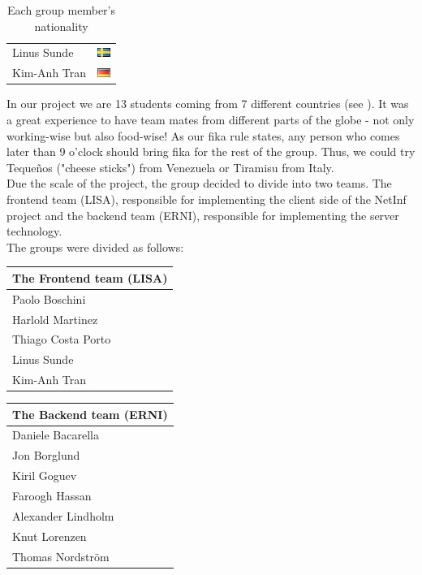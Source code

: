 \begin{table}
\begin{tabular}{|l|c|}
Linus Sunde & \includegraphics{graphics/se.png} \\
Kim-Anh Tran & \includegraphics{graphics/de.png} \\
\hline
\end{tabular}
\caption{Each group member's nationality}\label{fig:nationality}
\end{table}

In our project we are 13 students coming from 7 different countries (see ).
It was a great experience to have team mates from different parts of the globe - not
only working-wise but also food-wise! As our fika rule states, any person who comes later
than 9 o'clock should bring fika for the rest of the group. Thus, we could
try Teque\~{n}os ("cheese sticks") from Venezuela or Tiramisu from Italy.\\

Due the scale of the project, the group decided to divide into two teams. 
The frontend team (LISA), responsible for implementing the client side of the NetInf project and the backend team (ERNI), responsible for implementing the server technology.\\

The groups were divided as follows:

\begin{minipage}[b]{0.32\hsize}\centering
\begin{tabular}{l}
The Frontend team (LISA) \\\hline
Paolo Boschini\\
Harlold Martinez\\
Thiago Costa Porto\\
Linus Sunde\\
Kim-Anh Tran
\end{tabular}
\end{minipage}
\hfill
\begin{minipage}[b]{0.32\hsize}\centering
\begin{tabular}{l}
The Backend team (ERNI) \\\hline
Daniele Bacarella\\
Jon Borglund\\
Kiril Goguev\\
Faroogh Hassan\\
Alexander Lindholm\\
Knut Lorenzen\\
Thomas Nordstr\"om
\end{tabular}
\end{minipage}

